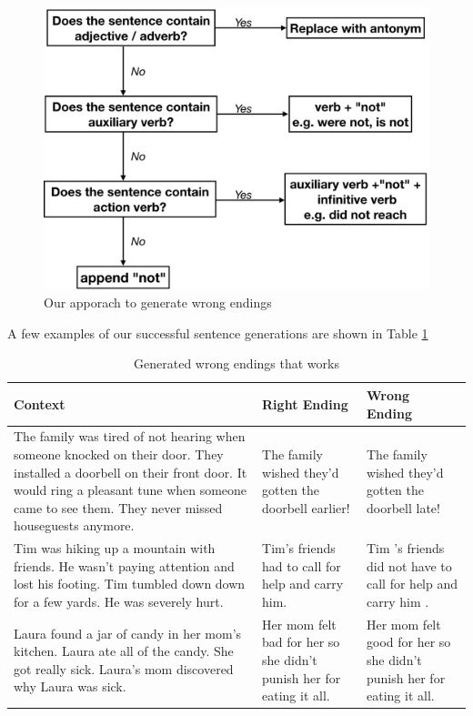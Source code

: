 \documentclass{article}
\begin{document}
\begin{figure}
  \centering
  \includegraphics[width=0.7 \linewidth]{fig/wrong.PNG}
  \caption{Our apporach to generate wrong endings}
  \label{Figure:wrong}
\end{figure}


A few examples of our successful sentence generations are shown in Table \ref{Tab:works}

\begin{table}[h]\footnotesize
  \centering

  \begin{tabular}{ p{6cm} p{3cm} p{3cm} }
    \toprule
    Context & Right Ending & Wrong Ending \\
    \midrule
    The family was tired of not hearing when someone knocked on their door. They installed a doorbell on their front door. It would ring a pleasant tune when someone came to see them. They never missed houseguests anymore.  & The family wished they'd gotten the doorbell earlier! & The family wished they'd gotten the doorbell late! \\
    \hline
    Tim was hiking up a mountain with friends. He wasn't paying attention and lost his footing. Tim tumbled down down for a few yards. He was severely hurt. & Tim's friends had to call for help and carry him. & Tim 's friends did not have to call for help and carry him . \\
    \hline
    Laura found a jar of candy in her mom's kitchen. Laura ate all of the candy. She got really sick. Laura's mom discovered why Laura was sick. & Her mom felt bad for her so she didn't punish her for eating it all. & Her mom felt good for her so she didn't punish her for eating it all.\\
    \bottomrule
  \end{tabular}
  \label{Tab:works}
  \caption{Generated wrong endings that works}
\end{table}
\end{document}
